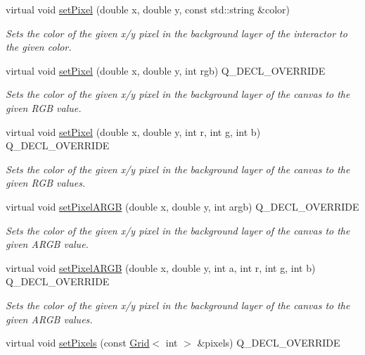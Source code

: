 \begin{DoxyCompactItemize}
virtual void \mbox{\hyperlink{classGDrawingSurface_a09f9640e4ff7388dcfc391efd88d2415}{set\+Pixel}} (double x, double y, const std\+::string \&color)
\begin{DoxyCompactList}\small\item\em Sets the color of the given x/y pixel in the background layer of the interactor to the given color. \end{DoxyCompactList}\item 
virtual void \mbox{\hyperlink{classGCanvas_a1fd61df1d79ebf3db7935d5c38c222e5}{set\+Pixel}} (double x, double y, int rgb) Q\+\_\+\+D\+E\+C\+L\+\_\+\+O\+V\+E\+R\+R\+I\+DE
\begin{DoxyCompactList}\small\item\em Sets the color of the given x/y pixel in the background layer of the canvas to the given R\+GB value. \end{DoxyCompactList}\item 
virtual void \mbox{\hyperlink{classGCanvas_af9aca140f86a6de6a4368d41349dd57c}{set\+Pixel}} (double x, double y, int r, int g, int b) Q\+\_\+\+D\+E\+C\+L\+\_\+\+O\+V\+E\+R\+R\+I\+DE
\begin{DoxyCompactList}\small\item\em Sets the color of the given x/y pixel in the background layer of the canvas to the given R\+GB values. \end{DoxyCompactList}\item 
virtual void \mbox{\hyperlink{classGCanvas_a366f5f71f21ad732fd2e2fdf624f0953}{set\+Pixel\+A\+R\+GB}} (double x, double y, int argb) Q\+\_\+\+D\+E\+C\+L\+\_\+\+O\+V\+E\+R\+R\+I\+DE
\begin{DoxyCompactList}\small\item\em Sets the color of the given x/y pixel in the background layer of the canvas to the given A\+R\+GB value. \end{DoxyCompactList}\item 
virtual void \mbox{\hyperlink{classGCanvas_a3de28156839da845f8d24503c9a3b111}{set\+Pixel\+A\+R\+GB}} (double x, double y, int a, int r, int g, int b) Q\+\_\+\+D\+E\+C\+L\+\_\+\+O\+V\+E\+R\+R\+I\+DE
\begin{DoxyCompactList}\small\item\em Sets the color of the given x/y pixel in the background layer of the canvas to the given A\+R\+GB values. \end{DoxyCompactList}\item 
virtual void \mbox{\hyperlink{classGCanvas_a83fcae972f2677bf1ece054930f53162}{set\+Pixels}} (const \mbox{\hyperlink{classGrid}{Grid}}$<$ int $>$ \&pixels) Q\+\_\+\+D\+E\+C\+L\+\_\+\+O\+V\+E\+R\+R\+I\+DE

\end{DoxyCompactItemize}
